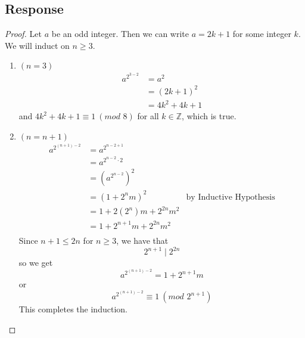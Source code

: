 \documentclass[13pt]{article}
\begin{document}
\subsection*{Response}
\begin{proof}
  Let $a$ be an odd integer. Then we can write $a = 2k + 1$ for some integer $k$. We will induct on
  $n \geq 3$. \\
  \begin{enumerate}[label=\textbf{(\roman*)}]
  \item $(n = 3)$ \\
    \begin{align*}
      a^{2^{3 - 2}} &= a^2 \\
                    &= (2k + 1)^2 \\
                    &= 4k^2 + 4k + 1
    \end{align*}
    and $4k^2 + 4k + 1 \equiv 1 \ (\textit{mod } 8)$ for all $k \in \mathbb{Z}$, which is true.

  \item $(n = n + 1)$ \\
    \begin{align*}
      a^{2^{(n + 1) - 2}} &= a^{2^{n - 2 + 1}} \\
                          &= a^{2^{n - 2} \cdot 2} \\
                          &= \left(a^{2^{n - 2}}\right)^2 \\
                          &= (1 + 2^n m)^2 & \text{by Inductive Hypothesis} \\
                          &= 1 + 2(2^n) m + 2^{2n} m^2 \\
                          &= 1 + 2^{n + 1}m + 2^{2n} m^2 \\
    \end{align*}
    Since $n + 1 \leq 2n$ for $n \geq 3$, we have that
    \[2^{n + 1} \mid 2^{2n}\]
    so we get
    \[a^{2^{(n + 1) - 2}} = 1 + 2^{n + 1}m\]
    or
    \[a^{2^{(n + 1) - 2}} \equiv 1 \ (\textit{mod } 2^{n + 1})\]
    This completes the induction.
  \end{enumerate}
\end{proof}
\end{document}
